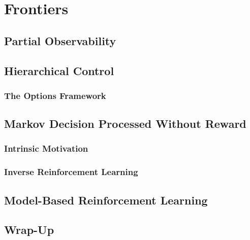\chapter{Frontiers} %

    \section{Partial Observability} %

    \section{Hierarchical Control} %

        \subsection{The Options Framework} %

    \section{Markov Decision Processed Without Reward} %

        \subsection{Intrinsic Motivation} %

        \subsection{Inverse Reinforcement Learning} %

    \section{Model-Based Reinforcement Learning} %

    \section{Wrap-Up} %
